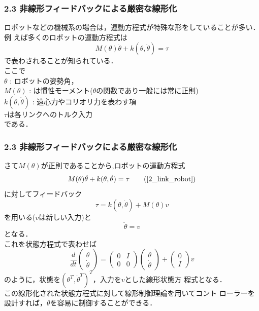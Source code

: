 \begin{frame}[t]
\frametitle{2.3 非線形フィードバックによる厳密な線形化}
ロボットなどの機械系の場合は，運動方程式が特殊な形をしていることが多い．例
えば多くのロボットの運動方程式は
\begin{equation}
 M(\theta) \ddot{\theta} + k(\theta, \dot{\theta}) = \tau
  \label{2_link_robot}
\end{equation}
で表わされることが知られている．\\
ここで\\
$\theta$ : ロボットの姿勢角，\\
$M(\theta)$ : は慣性モーメント($\theta$の関数であり一般には常に正則)\\
$k(\theta, \dot{\theta})$ : 遠心力やコリオリ力を表わす項\\
$\tau$は各リンクへのトルク入力\\
である．
\end{frame}

\begin{frame}[t]
\frametitle{2.3 非線形フィードバックによる厳密な線形化}
さて$M(\theta)$が正則であることから,ロボットの運動方程式
\begin{equation}
 M(\theta) \ddot{\theta} + k(\theta, \dot{\theta}) = \tau
  \tag{\ref{2_link_robot}}
\end{equation}
に対してフィードバック
\begin{equation}
 \tau = k(\theta,\dot{\theta}) + M(\theta) v 
\end{equation}
を用いる($v$は新しい入力)と
\begin{equation}
 \ddot{\theta} = v 
\end{equation}
となる．\\
これを状態方程式で表わせば
\begin{equation}
 \frac{d}{dt}
  \left(\begin{array}{c}
   \theta \\
	 \dot{\theta}
	\end{array}\right)
  =
  \left(\begin{array}{cc}
   0 & I \\
	 0 & 0 
	\end{array}\right)
  \left(\begin{array}{c}
   \theta \\
	 \dot{\theta}
	\end{array}\right)
  +
  \left(\begin{array}{c}
   0 \\
	 I
	\end{array}\right)
  v
  \label{robot_linearized_sys}
\end{equation}
のように，状態を$(\theta^T, \dot{\theta}^T)^T$，入力を$v$とした線形状態方
程式となる．\\
この線形化された状態方程式に対して線形制御理論を用いてコント
ローラーを設計すれば，$\theta$を容易に制御することができる．
\end{frame}

